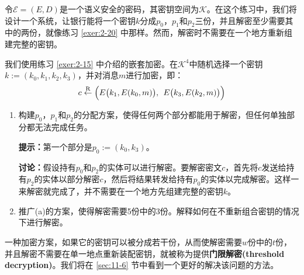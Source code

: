 \begin{exercise}[简单的门限解密]
令$\mathcal{E}=(E,D)$是一个语义安全的密码，其密钥空间为$\mathcal{K}$。在这个练习中，我们将设计一个系统，让银行能将一个密钥$k$分成$p_0$，$p_1$和$p_2$三份，并且解密至少需要其中的两份，就像练习 \ref{exer:2-20} 中那样。然而，解密时不需要在一个地方重新组建完整的密钥。

我们使用练习 \ref{exer:2-15} 中介绍的嵌套加密。在$\mathcal{K}^4$中随机选择一个密钥$k:=(k_0,k_1,k_2,k_3)$，并对消息$m$进行加密，即：
\[
c\overset{\rm R}\leftarrow\Big( E\big(k_1,E(k_0,m)\big),\;\,E\big(k_3,E(k_2,m)\big)\Big)
\]
\begin{enumerate}[\indent(a)]
	\item 构建$p_0$，$p_1$和$p_2$的分配方案，使得任何两个部分都能用于解密，但任何单独部分都无法完成任务。

	\vspace{1pt}

	\textbf{提示：}第一个部分是$p_0:=(k_0,k_3)$。
	
	\vspace{1pt}

	\textbf{讨论：}假设持有$p_0$和$p_2$的实体可以进行解密。要解密密文$c$，首先将$c$发送给持有$p_2$的实体以部分解密$c$，然后将结果转发给持有$p_0$的实体以完成解密。这样一来解密就完成了，并不需要在一个地方先组建完整的密钥$k$。
	\item 推广(a)的方案，使得解密需要5份中的3份。解释如何在不重新组合密钥的情况下进行解密。
\end{enumerate}
一种加密方案，如果它的密钥可以被分成若干份，从而使解密需要$w$份中的$t$份，并且解密不需要在单一地点重新装配密钥，就被称为提供\textbf{门限解密(threshold decryption)}。我们将在 \ref{sec:11-6} 节中看到一个更好的解决该问题的方法。
\end{exercise}

